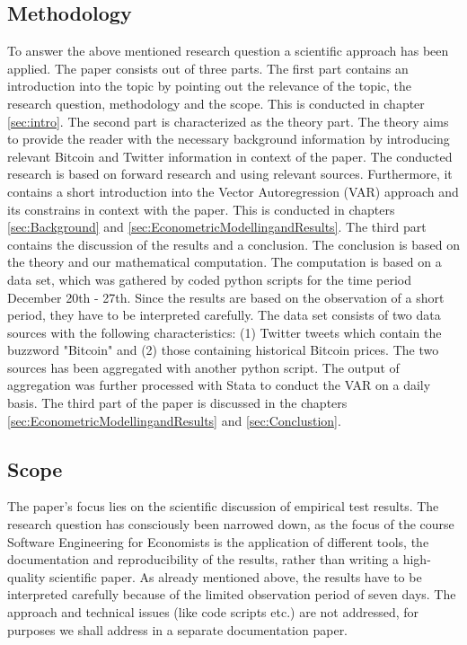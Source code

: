 \documentclass[a4paper,american,12pt]{article}
\begin{document}
\begin{spacing}{1.2}
\subsection{Methodology}
\label{sec:Methodology}
To answer the above mentioned research question a scientific approach has been applied. The paper consists out of three parts. The first part contains an introduction into the topic by pointing out the relevance of the topic, the research question, methodology and the scope. This is conducted in chapter \ref{sec:intro}. The second part is characterized as the theory part. The theory aims to provide the reader with the necessary background information by introducing relevant Bitcoin and Twitter information in context of the paper. The conducted research is based on forward research and using relevant sources. Furthermore, it contains a short introduction into the Vector Autoregression (VAR) approach and its constrains in context with the paper. This is conducted in chapters \ref{sec:Background} and \ref{sec:EconometricModellingandResults}. The third part contains the discussion of the results and a conclusion. The conclusion is based on the theory and our mathematical computation. The computation is based on a data set, which was gathered by coded python scripts for the time period December 20th - 27th. Since the results are based on the observation of a short period, they have to be interpreted carefully. The data set consists of two data sources with the following characteristics: (1) Twitter tweets which contain the buzzword "Bitcoin" and (2) those containing historical Bitcoin prices. The two sources has been aggregated with another python script. The output of aggregation was further processed with Stata to conduct the VAR on a daily basis. The third part of the paper is discussed in the chapters \ref{sec:EconometricModellingandResults} and \ref{sec:Conclustion}.

\subsection{Scope}
\label{sec:Scope}
The paper's focus lies on the scientific discussion of empirical test results. The research question has consciously been narrowed down, as the focus of the course Software Engineering for Economists is the application of different tools, the documentation and reproducibility of the results, rather than writing a high-quality scientific paper. As already mentioned above, the results have to be interpreted carefully because of the limited observation period of seven days. The approach and technical issues (like code scripts etc.) are not addressed, for purposes we shall address in a separate documentation paper.


\end{spacing}
\end{document}
